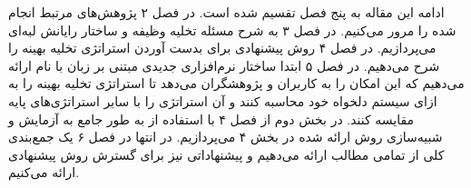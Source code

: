 ادامه این مقاله به پنج فصل تقسیم شده است. در فصل ۲ پژوهش‌های مرتبط انجام شده را مرور می‌کنیم. در فصل ۳ به شرح مسئله تخلیه وظیفه و ساختار رایانش لبه‌ای می‌پردازیم. در فصل ۴ روش پیشنهادی برای بدست آوردن استراتژی تخلیه بهینه را شرح می‌دهیم. در فصل ۵ ابتدا ساختار نرم‌افزاری جدیدی مبتنی بر زبان  با نام  ارائه می‌دهیم که این امکان را به کاربران و پژوهشگران می‌دهد تا استراتژی تخلیه بهینه را به ازای سیستم دلخواه خود محاسبه کنند و آن استراتژی را با سایر استراتژی‌های پایه مقایسه کنند. در بخش دوم از فصل ۴ با استفاده از  به طور جامع به آزمایش و شبیه‌سازی روش ارائه شده در بخش ۴ می‌پردازیم. در انتها در فصل ۶ یک جمع‌بندی کلی از تمامی مطالب ارائه می‌دهیم و پیشنهاداتی نیز برای گسترش روش پیشنهادی ارائه می‌کنیم.


\clearpage
